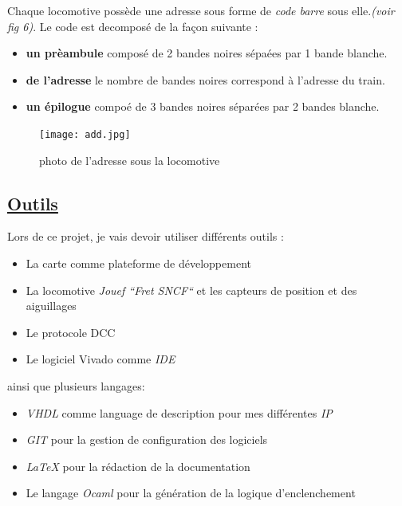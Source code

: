   Chaque locomotive poss\`ede une adresse sous forme de \emph{code
  barre} sous elle.\emph{(voir fig 6)}.
Le code \barre est decompos\'e de la façon suivante :
\begin{itemize}
    \item \textbf{un pr\`eambule} compos\'e de 2 bandes noires
      s\'epa\'ees par 1 bande blanche.
    \item \textbf{de l'adresse} le nombre de bandes noires correspond
      à l'adresse du train. 
    \item \textbf{un  \'epilogue} compo\'e de 3 bandes noires
      s\'epar\'ees par 2 bandes blanche.
\end{itemize}

\begin{figure}[ht]
\centering
\texttt{[image: add.jpg]}
\caption{photo de l'adresse sous la locomotive}
\label{fig6}
\end{figure}

\newpage


\subsection{\underline{ Outils}}
\label{sec:outils}

Lors de ce projet, je vais devoir utiliser diff\'erents outils :
\begin{itemize}
  \item La carte \crt comme plateforme de d\'eveloppement
  \item La locomotive \emph{Jouef ``Fret SNCF``}\cite{Jouef}  et les capteurs de
    position et des aiguillages
  \item Le protocole DCC \cite{DCC}
  \item Le logiciel Vivado comme \emph{IDE}
\end{itemize}

ainsi que plusieurs langages:
\begin{itemize}
  \item \emph{VHDL}\cite{VHDL} comme language de description pour mes diff\'erentes
    \emph{IP}
  \item \emph{GIT}\cite{GIT} pour la gestion de configuration des logiciels
  \item \emph{\LaTeX}\cite{LATEX} pour la r\'edaction de la documentation
  \item Le langage \emph{Ocaml}\cite{OCAML} pour la g\'en\'eration de la logique d'enclenchement
\end{itemize}



